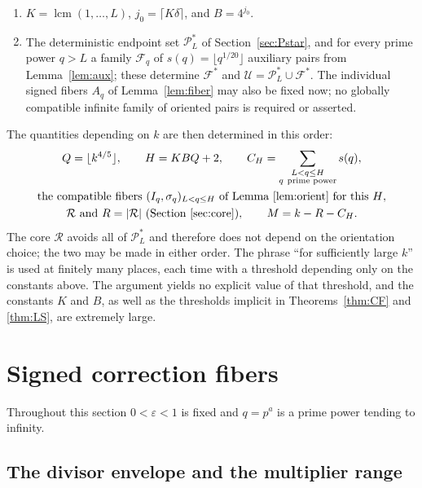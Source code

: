\documentclass[11pt,letterpaper]{article}
\numberwithin{equation}{section}
\theoremstyle{plain}
\theoremstyle{remark}
\newcommand{\cP}{\mathcal P}
\newcommand{\cF}{\mathcal F}
\newcommand{\cU}{\mathcal U}
\newcommand{\cR}{\mathcal R}
\newcommand{\lcm}{\operatorname{lcm}}
\begin{document}
\begin{enumerate}
\begin{enumerate}
\end{enumerate}
Each condition holds for all sufficiently large $L$, so a single choice of $L$ meets all of them; condition (a) alone is not sufficient for the construction.
\item $K=\lcm(1,\ldots,L)$, $j_0=\lceil K\delta\rceil$, and $B=4^{j_0}$.
\item The deterministic endpoint set $\cP^*_L$ of Section~\ref{sec:Pstar}, and for every prime power $q>L$ a family $\cF_q$ of $s(q)=\lfloor q^{1/20}\rfloor$ auxiliary pairs from Lemma~\ref{lem:aux}; these determine $\cF^*$ and $\cU=\cP^*_L\cup\cF^*$. The individual signed fibers $A_q$ of Lemma~\ref{lem:fiber} may also be fixed now; no globally compatible infinite family of oriented pairs is required or asserted.
\end{enumerate}

The quantities depending on $k$ are then determined in this order:
\begin{gather*}
Q=\lfloor k^{4/5}\rfloor,\qquad H=KBQ+2,\qquad
C_H=\sum_{\substack{L<q\le H\\ q\ \text{prime power}}}s(q),\\
\text{the compatible fibers $(I_q,\sigma_q)_{L<q\le H}$ of Lemma~\ref{lem:orient} for this $H$},\\
\cR\ \text{and}\ R=|\cR|\ \text{(Section~\ref{sec:core})},\qquad M=k-R-C_H .
\end{gather*}
The core $\cR$ avoids all of $\cP^*_L$ and therefore does not depend on the orientation choice; the two may be made in either order. The phrase ``for sufficiently large $k$'' is used at finitely many places, each time with a threshold depending only on the constants above. The argument yields no explicit value of that threshold, and the constants $K$ and $B$, as well as the thresholds implicit in Theorems~\ref{thm:CF} and \ref{thm:LS}, are extremely large.

\section{Signed correction fibers}\label{sec:fibers}

Throughout this section $0<\varepsilon<1$ is fixed and $q=p^a$ is a prime power tending to infinity.

\subsection{The divisor envelope and the multiplier range}\label{sec:envelope}
\end{document}
